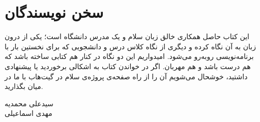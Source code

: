 \section*{سخن نویسندگان}

این کتاب حاصل همکاری خالق زبان سلام و یک مدرس دانشگاه است؛ یکی از درون
زبان به آن نگاه کرده و دیگری از نگاه کلاس درس و دانشجویی که برای نخستین بار
با برنامه‌نویسی روبه‌رو می‌شود. امیدواریم این دو نگاه در کنار هم کتابی
ساخته باشد که هم درست باشد و هم مهربان. اگر در خواندن کتاب به اشکالی
برخوردید یا پیشنهادی داشتید، خوشحال می‌شویم آن را از راه صفحه‌ی پروژه‌ی
سلام در گیت‌هاب با ما در میان بگذارید.

\begin{flushleft}
سیدعلی محمدیه\\
مهدی اسماعیلی
\end{flushleft}
\clearpage
